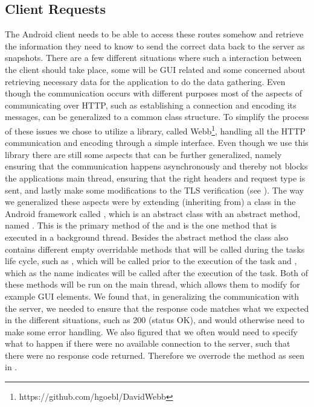 \subsection{Client Requests}
\label{sub:client_requests}
The Android client needs to be able to access these routes somehow and retrieve the information they need to know to send the correct data back to the server as snapshots. There are a few different situations where such a interaction between the client should take place, some will be GUI related and some concerned about retrieving necessary data for the application to do the data gathering. Even though the communication occurs with different purposes most of the aspects of communicating over HTTP, such as establishing a connection and encoding its messages, can be generalized to a common class structure. To simplify the process of these issues we chose to utilize a library, called Webb\footnote{https://github.com/hgoebl/DavidWebb}, handling all the HTTP communication and encoding through a simple interface. Even though we use this library there are still some aspects that can be further generalized, namely ensuring that the communication happens asynchronously and thereby not blocks the applications main thread, ensuring that the right headers and request type is sent, and lastly make some modifications to the TLS verification (see ). The way we generalized these aspects were by extending (inheriting from) a class in the Android framework called , which is an abstract class with an abstract method, named . This is the primary method of the  and is the one method that is executed in a background thread. Besides the abstract method the class also contains different empty overridable methods that will be called during the tasks life cycle, such as , which will be called prior to the execution of the task and , which as the name indicates will be called after the execution of the task. Both of these methods will be run on the main thread, which allows them to modify for example GUI elements. We found that, in generalizing the communication with the server, we needed to ensure that the response code matches what we expected in the different situations, such as 200 (status OK), and would otherwise need to make some error handling. We also figured that we often would need to specify what to happen if there were no available connection to the server, such that there were no response code returned. Therefore we overrode the  method as seen in . 

